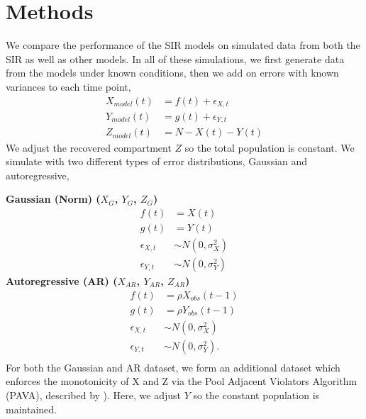 \documentclass[12pt]{article}
\begin{document}

\section{Methods}\label{sec:sim-res}

We compare the performance of the SIR models on simulated data from both the SIR as well as other models. In all of these simulations, we first generate data from the models under known conditions, then we add on errors with known variances to each time point,
\begin{align}\label{eq:sim-models}
  X_{model}(t) &= f(t) + \epsilon_{X,t} \\
  Y_{model}(t) &= g(t) + \epsilon_{Y,t} \nonumber\\
  Z_{model}(t) &= N - X(t) - Y(t)\nonumber 
\end{align}
We adjust the recovered compartment $Z$ so the total population is constant. 
We simulate with two different types of error distributions, Gaussian and autoregressive,

\noindent \textbf{Gaussian (Norm) ($X_{G}$, $Y_{G}$, $Z_{G}$)}
\begin{align*}
  f(t) &= X(t) \\
  g(t) &= Y(t) \\
  \epsilon_{X,t} &\sim N(0, \sigma_X^2) \\
  \epsilon_{Y,t} &\sim N(0, \sigma_Y^2)
\end{align*}
\textbf{Autoregressive (AR) ($X_{AR}$, $Y_{AR}$, $Z_{AR}$)}
\begin{align*}
  f(t) &= \rho X_{obs}(t-1) \\
  g(t) &= \rho Y_{obs}(t-1) \\
  \epsilon_{X,t} &\sim N(0, \sigma_X^2) \\
  \epsilon_{Y,t} &\sim N(0, \sigma_Y^2).\\
\end{align*}
For both the Gaussian and AR dataset, we form an additional dataset which enforces the monotonicity of X and Z via the Pool Adjacent Violators Algorithm (PAVA), described by \cite{friedman1984}).  Here, we adjust $Y$ so the constant population is maintained.
\end{document}
